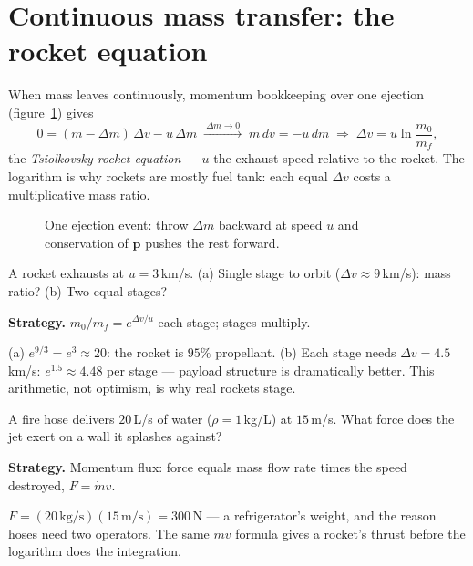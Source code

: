 \section{Continuous mass transfer: the rocket equation}\label{sec:mom-rocket}

When mass leaves continuously, momentum bookkeeping over one ejection
(figure~\ref{fig:rocket}) gives
\[
  0=(m-\Delta m)\,\Delta v-u\,\Delta m
  \;\xrightarrow{\ \Delta m\to0\ }\;
  m\,dv=-u\,dm
  \;\Rightarrow\;
  \Delta v=u\ln\frac{m_0}{m_f},
\]
the \emph{Tsiolkovsky rocket equation} --- $u$ the
exhaust speed relative to the rocket. The logarithm is why rockets are
mostly fuel tank: each equal $\Delta v$ costs a multiplicative mass ratio.

\begin{figure}[htbp]\centering

\caption{One ejection event: throw $\Delta m$ backward at speed $u$ and
conservation of $\mathbf p$ pushes the rest forward.}
\label{fig:rocket}
\end{figure}

\begin{example}\label{ex:rocket}
A rocket exhausts at $u=3$\,km/s. (a) Single stage to orbit
($\Delta v\approx9$\,km/s): mass ratio? (b) Two equal stages?
\par\smallskip
\textbf{Strategy.} $m_0/m_f=e^{\Delta v/u}$ each stage; stages multiply.
\begin{solution}
(a) $e^{9/3}=e^{3}\approx20$: the rocket is $95\%$ propellant.
(b) Each stage needs $\Delta v=4.5$\,km/s:
$e^{1.5}\approx4.48$ per stage --- payload structure is dramatically
better. This arithmetic, not optimism, is why real rockets stage. \checkmark
\end{solution}
\end{example}

\begin{example}\label{ex:jet}
A fire hose delivers $20$\,L/s of water ($\rho=1$\,kg/L) at
$15$\,m/s. What force does the jet exert on a wall it splashes against?
\par\smallskip
\textbf{Strategy.} Momentum flux: force equals mass flow rate times the
speed destroyed, $F=\dot m v$.
\begin{solution}
$F=(20\,\mathrm{kg/s})(15\,\mathrm{m/s})=300\,\mathrm{N}$ --- a
refrigerator's weight, and the reason hoses need two operators. The same
$\dot m v$ formula gives a rocket's thrust before the logarithm does the
integration. \checkmark
\end{solution}
\end{example}

